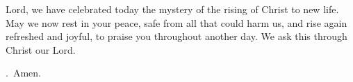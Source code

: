 \lettrine[loversize=0.15,lines=2]{L}{}ord,
we have celebrated today
the mystery of the rising of Christ to new life.
May we now rest in your peace,
safe from all that could harm us,
and rise again refreshed and joyful,
to praise you throughout another day.
We ask this through Christ our Lord.
\par \Rbar.~Amen.
